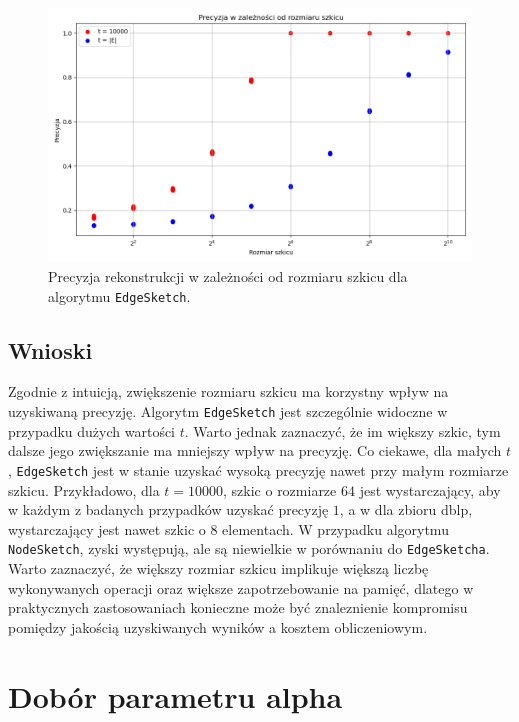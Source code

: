     \begin{figure}[!ht]
        \includegraphics[width=16cm]{img/precision_m.png}
        \centering
        \caption[Precyzja rekonstrukcji]{Precyzja rekonstrukcji w zależności od rozmiaru szkicu dla algorytmu \texttt{EdgeSketch}.}
        \label{fig:precision_m}
    \end{figure}
    
    \subsection{Wnioski}
    Zgodnie z intuicją, zwiększenie rozmiaru szkicu ma korzystny wpływ na uzyskiwaną precyzję. Algorytm \texttt{EdgeSketch} jest szczególnie widoczne w przypadku dużych wartości $t$. Warto jednak zaznaczyć, że im większy szkic, tym dalsze jego zwiększanie ma mniejszy wpływ na precyzję. Co ciekawe, dla małych $t$, \texttt{EdgeSketch} jest w stanie uzyskać wysoką precyzję nawet przy małym rozmiarze szkicu. Przykładowo, dla $t = 10000$, szkic o rozmiarze $64$ jest wystarczający, aby w każdym z badanych przypadków uzyskać precyzję $1$, a w dla zbioru dblp, wystarczający jest nawet szkic o $8$ elementach. W przypadku algorytmu \texttt{NodeSketch}, zyski występują, ale są niewielkie w porównaniu do \texttt{EdgeSketcha}. Warto zaznaczyć, że większy rozmiar szkicu implikuje większą liczbę wykonywanych operacji oraz większe zapotrzebowanie na pamięć, dlatego w praktycznych zastosowaniach konieczne może być znaleznienie kompromisu pomiędzy jakością uzyskiwanych wyników a kosztem obliczeniowym.

\section{Dobór parametru alpha}

